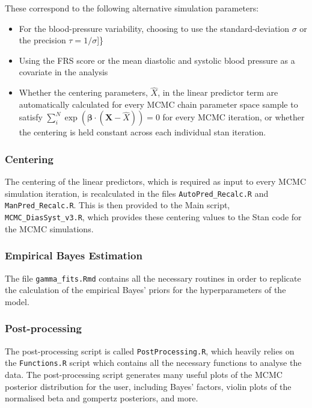 \documentclass[
]{article}
\providecommand{\tightlist}{%
  \setlength{\itemsep}{0pt}\setlength{\parskip}{0pt}}
\begin{document}
These correspond to the following alternative simulation parameters:

\begin{itemize}
\tightlist
\item
  For the blood-pressure variability, choosing to use the
  standard-deviation \(\sigma\) or the precision \(\tau=1/\sigma\){]}\}
\item
  Using the FRS score or the mean diastolic and systolic blood pressure
  as a covariate in the analysis
\item
  Whether the centering parameters, \(\hat{X}\), in the linear predictor
  term are automatically calculated for every MCMC chain parameter space
  sample to satisfy
  \(\sum_i^N \exp{(\boldsymbol{\beta}\cdot(\boldsymbol{X}-\hat{X}))}=0\)
  for every MCMC iteration, or whether the centering is held constant
  across each individual stan iteration.
\end{itemize}

\hypertarget{centering}{%
\subsubsection{Centering}\label{centering}}

The centering of the linear predictors, which is required as input to
every MCMC simulation iteration, is recalculated in the files
\texttt{AutoPred\_Recalc.R} and \texttt{ManPred\_Recalc.R}. This is then
provided to the Main script, \texttt{MCMC\_DiasSyst\_v3.R}, which
provides these centering values to the Stan code for the MCMC
simulations.

\hypertarget{empirical-bayes-estimation}{%
\subsubsection{Empirical Bayes
Estimation}\label{empirical-bayes-estimation}}

The file \texttt{gamma\_fits.Rmd} contains all the necessary routines in
order to replicate the calculation of the empirical Bayes' priors for
the hyperparameters of the model.

\hypertarget{post-processing}{%
\subsubsection{Post-processing}\label{post-processing}}

The post-processing script is called \texttt{PostProcessing.R}, which
heavily relies on the \texttt{Functions.R} script which contains all the
necessary functions to analyse the data. The post-processing script
generates many useful plots of the MCMC posterior distribution for the
user, including Bayes' factors, violin plots of the normalised beta and
gompertz posteriors, and more.
\end{document}

